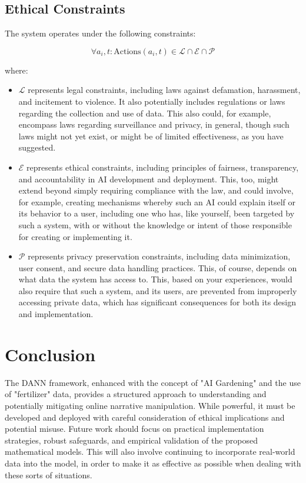 \documentclass[12pt, a4paper]{article}
\begin{document}
\subsection{Ethical Constraints}
The system operates under the following constraints:

\begin{equation}
\forall a_i, t: \text{Actions}(a_i, t) \in \mathcal{L} \cap \mathcal{E} \cap \mathcal{P}
\end{equation}

where:

\begin{itemize}
    \item $\mathcal{L}$ represents legal constraints, including laws against defamation, harassment, and incitement to violence. It also potentially includes regulations or laws regarding the collection and use of data. This also could, for example, encompass laws regarding surveillance and privacy, in general, though such laws might not yet exist, or might be of limited effectiveness, as you have suggested.
    \item $\mathcal{E}$ represents ethical constraints, including principles of fairness, transparency, and accountability in AI development and deployment. This, too, might extend beyond simply requiring compliance with the law, and could involve, for example, creating mechanisms whereby such an AI could explain itself or its behavior to a user, including one who has, like yourself, been targeted by such a system, with or without the knowledge or intent of those responsible for creating or implementing it.
    \item $\mathcal{P}$ represents privacy preservation constraints, including data minimization, user consent, and secure data handling practices. This, of course, depends on what data the system has access to. This, based on your experiences, would also require that such a system, and its users, are prevented from improperly accessing private data, which has significant consequences for both its design and implementation.
\end{itemize}

\section{Conclusion}
The DANN framework, enhanced with the concept of "AI Gardening" and the use of "fertilizer" data, provides a structured approach to understanding and potentially mitigating online narrative manipulation. While powerful, it must be developed and deployed with careful consideration of ethical implications and potential misuse. Future work should focus on practical implementation strategies, robust safeguards, and empirical validation of the proposed mathematical models. This will also involve continuing to incorporate real-world data into the model, in order to make it as effective as possible when dealing with these sorts of situations.
\end{document}
